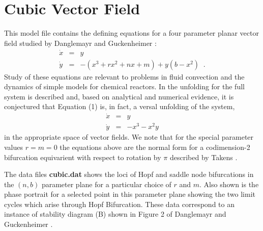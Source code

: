 \section{Cubic Vector Field}

\noindent This model file contains the defining equations for a four parameter
planar vector field studied by Danglemayr and Guckenheimer \cite{dangle1}:
\begin{eqnarray*}
  \dot{x} & = & y \\
  \dot{y} & = & -(x^3 + r x^2 + n x + m ) + y(b-x^2) \; \; .
\end{eqnarray*}
Study of these equations are relevant to problems in fluid convection  and
the dynamics of simple models for chemical reactors. 
In \cite{dangle1} the unfolding for the full
system is described and, based on analytical and numerical evidence, it
is conjectured that Equation (1) is, in fact, a versal unfolding of the
system,
\begin{eqnarray*}
  \dot{x} & = & y \\ 
  \dot{y} & = & -x^3-x^2y  
\end{eqnarray*}
in the appropriate space of vector fields.
We note that for the special parameter values $r=m=0$ the equations above
are the normal form for a codimension-2 bifurcation equivarient with respect
to rotation by $\pi$ described by Takens \cite{takens1}.
\medskip

\noindent The data files {\bf cubic.dat} shows the loci of Hopf and saddle node
bifurcations in the $(n,b)$ parameter plane for a particular choice of $r$ and $m$.
Also shown is the phase portrait for a selected point in this parameter plane 
showing the two limit cycles which arise through Hopf Bifurcation.  These data
correspond to an instance of stability diagram (B) shown in Figure 2 of
Danglemayr and Guckenheimer \cite{dangle1}. 
